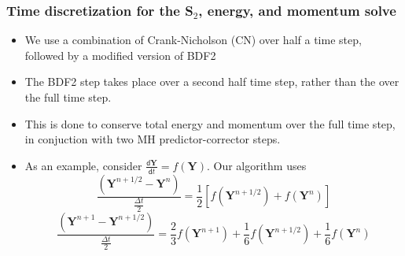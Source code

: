 \documentclass[xcolor=dvipsnames,fontsize=8pt]{beamer}
\newcommand{\BY}[0]{\ensuremath{\mathbf{Y}}}
\newlength{\wideitemsep}
\let\olditem\item
\renewcommand{\item}{\setlength{\itemsep}{\wideitemsep}\olditem}
\newcommand{\Dt}{\Delta t}
\renewcommand{\d}{\mathsf{d}}
\begin{document}
\begin{frame}
    \frametitle{Time discretization for the S$_2$, energy, and momentum solve}
    \begin{itemize}
        \item  We use a combination of Crank-Nicholson (CN) over half a time step,
            followed by a modified
            version of BDF2 
        \item  The BDF2 step takes place over a second half time step, rather than the
            over the full time step.
        \item This is done to conserve total energy and momentum over the full time
            step, in conjuction with two MH predictor-corrector steps.
        \item As an example, consider $\frac{\d \BY}{\d t} = f(\BY)$. Our algorithm uses
            \begin{equation*}
                \frac{(\BY^{n+1/2} - \BY^n)}{\frac{\Dt}{2}} = \frac{1}{2}\left[f(\BY^{n+1/2}) + f(\BY^{n})\right]
            \end{equation*}
            \begin{equation*}
            \frac{(\BY^{n+1} - \BY^{n+1/2})}{\frac{\Dt}{2}} = \frac{2}{3}f(\BY^{n+1})
        + \frac{1}{6}f(\BY^{n+1/2})+ \frac{1}{6}f(\BY^{n})
            \end{equation*}
    \end{itemize}
\end{frame}
\end{document}
